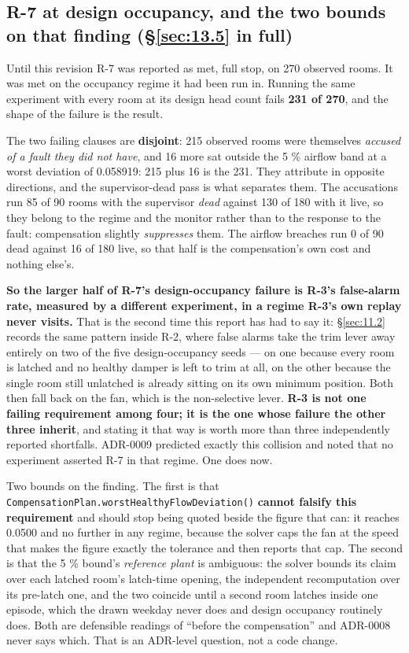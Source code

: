 \subsection{R-7 at design occupancy, and the two bounds on that finding (\texorpdfstring{\S\ref{sec:13.5}}{13.5} in full)}\label{sec:I.4}

Until this revision R-7 was reported as met, full stop, on 270 observed rooms. It was met on the
occupancy regime it had been run in. Running the same experiment with every room at its design head
count fails \textbf{231 of 270}, and the shape of the failure is the result.

The two failing clauses are \textbf{disjoint}: 215 observed rooms were themselves \emph{accused of a
fault they did not have}, and 16 more sat outside the 5 \% airflow band at a worst deviation of
0.058919: 215 plus 16 is the 231. They attribute in opposite directions, and the supervisor-dead
pass is what separates them. The accusations run 85 of 90 rooms with the supervisor \emph{dead}
against 130 of 180 with it live, so they belong to the regime and the monitor rather than to the
response to the fault: compensation slightly \emph{suppresses} them. The airflow breaches run 0 of
90 dead against 16 of 180 live, so that half is the compensation's own cost and nothing else's.

\textbf{So the larger half of R-7's design-occupancy failure is R-3's false-alarm rate, measured by a
different experiment, in a regime R-3's own replay never visits.} That is the second time this report
has had to say it: §\ref{sec:11.2} records the same pattern inside R-2, where false alarms take the
trim lever away entirely on two of the five design-occupancy seeds — on one because every room is
latched and no healthy damper is left to trim at all, on the other because the single room still
unlatched is already sitting on its own minimum position. Both then fall back on the fan, which is
the non-selective lever. \textbf{R-3 is
not one failing requirement among four; it is the one whose failure the other three inherit}, and
stating it that way is worth more than three independently reported shortfalls. ADR-0009 predicted
exactly this collision and noted that no experiment asserted R-7 in that regime. One does now.

Two bounds on the finding. The first is that \texttt{CompensationPlan.worstHealthyFlowDeviation()}
\textbf{cannot falsify this requirement} and should stop being quoted beside the figure that can: it
reaches 0.0500 and no further in any regime, because the solver caps the fan at the speed that makes
the figure exactly the tolerance and then reports that cap. The second is that the 5 \% bound's
\emph{reference plant} is ambiguous: the solver bounds its claim over each latched room's
latch-time opening, the independent recomputation over its pre-latch one, and the two coincide until
a second room latches inside one episode, which the drawn weekday never does and design occupancy
routinely does. Both are defensible readings of ``before the compensation'' and ADR-0008 never says
which. That is an ADR-level question, not a code change.

